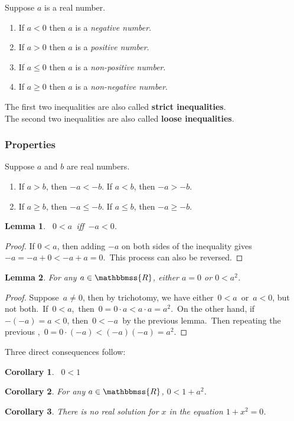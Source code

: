 \documentclass[12pt]{article}
\newcommand{\R}{\mathbbmss{R}}
\newtheorem{lemma}{Lemma}
\newtheorem{cor}{Corollary}
\begin{document}
Suppose $a$ is a real number. 
\begin{enumerate}
\item If $a<0$ then $a$ is a \emph{negativ{e} number}.
\item If $a>0$ then $a$ is a \emph{positiv{e} number}.
\item If $a\le 0$ then $a$ is a \emph{non-positiv{e} number}.
\item If $a\ge 0$ then $a$ is a \emph{non-negativ{e} number}.
\end{enumerate}
The first two inequalities are also called {\bf strict inequalities}.\\
The second two inequalities are also called {\bf loose inequalities}.

\subsubsection*{Properties}
Suppose $a$ and $b$ are real numbers.
\begin{enumerate}
\item If $a>b$, then $-a<-b$. If $a<b$, then $-a>-b$.
\item If $a\ge b$, then $-a\le -b$. If $a\le b$, then $-a\ge -b$.
\end{enumerate}

\begin{lemma}\, $0<a$\, iff\, $-a<0$.
\end{lemma}

\begin{proof}  If $0<a$, then adding $-a$ on both sides of the inequality gives $-a=-a+0<-a+a=0$.\, This process can also be reversed.
\end{proof}


\begin{lemma} For any $a\in \R$, either $a=0$ or $0<a^2$.
\end{lemma}

\begin{proof}
Suppose\, $a\ne 0$, then by trichotomy, we have either\, $0<a$\, or\, $a<0$, but not both.\,  If\, $0<a$,\, then\, $0=0\cdot a<a\cdot a=a^2$.\,  On the other hand, if\, $-(-a)=a<0$, then\, $0<-a$\, by the previous lemma.\,  Then repeating the previous ,\, $0 = 0\cdot(-a) < (-a)(-a)=a^2$.  
\end{proof}

Three direct consequences follow:
\begin{cor}\, $0<1$ \end{cor}
\begin{cor} For any $a\in \R$, $0<1+a^2$. \end{cor}
\begin{cor} There is no real solution for $x$ in the equation $1+x^2=0$. 
\end{cor}
\end{document}
